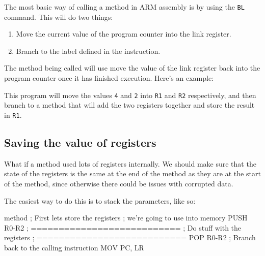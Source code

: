 The most basic way of calling a method in ARM assembly is by using the {\tt BL}
command. This will do two things:

\begin{enumerate}
	\item Move the current value of the program counter into the link register.
	\item Branch to the label defined in the instruction.
\end{enumerate}

The method being called will use move the value of the link register back into
the program counter once it has finished execution. Here's an example:


This program will move the values {\tt 4} and {\tt 2} into {\tt R1} and {\tt R2}
respectively, and then branch to a method that will add the two registers
together and store the result in {\tt R1}.

\subsection{Saving the value of registers}

What if a method used lots of registers internally. We should make sure that the
state of the registers is the same at the end of the method as they are at the
start of the method, since otherwise there could be issues with corrupted data.

The easiest way to do this is to stack the parameters, like so:

\begin{listing}{1}
method
	; First lets store the registers
	; we're going to use into memory
	PUSH 	{R0-R2}
	; ===========================
	; Do stuff with the registers
	; ===========================
	POP 	{R0-R2}
	; Branch back to the calling instruction
	MOV 	PC, LR
\end{listing}


